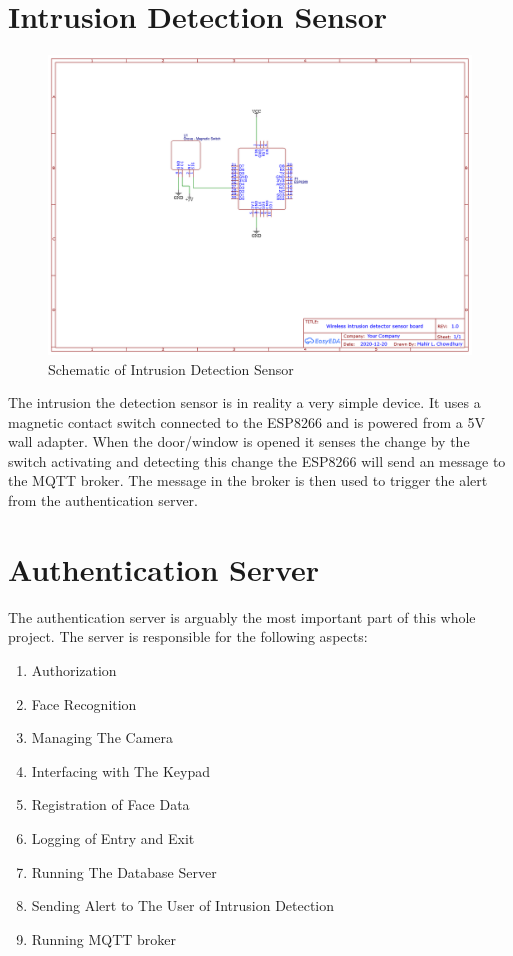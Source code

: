 \section{Intrusion Detection Sensor}
    \begin{figure}[H]
        \centering
        \includegraphics[width=16cm]{images/schematic.png}
        \caption{Schematic of Intrusion Detection Sensor}
    \end{figure}
    \begin{flushleft}
        The intrusion the detection sensor is in reality a very simple device. It uses a magnetic contact switch connected 
        to the ESP8266 and is powered from a 5V wall adapter. When the door/window is opened it senses the change by the switch activating 
        and detecting this change the ESP8266 will send an message to the MQTT broker. The message in the broker is then used to 
        trigger the alert from the authentication server.  
    \end{flushleft}


\section{Authentication Server}
    \begin{flushleft}
        The authentication server is arguably the most important part of this whole project. The server is responsible 
        for the following aspects:
    \end{flushleft}
    \begin{enumerate}
        \item Authorization
        \item Face Recognition
        \item Managing The Camera
        \item Interfacing with The Keypad
        \item Registration of Face Data
        \item Logging of Entry and Exit
        \item Running The Database Server
        \item Sending Alert to The User of Intrusion Detection
        \item Running MQTT broker
    \end{enumerate}
